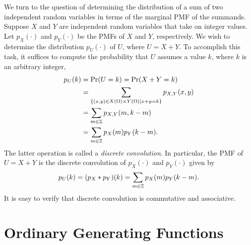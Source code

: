 We turn to the question of determining the distribution of a sum of two independent random variables in terms of the marginal PMF of the summands.
Suppose $X$ and $Y$ are independent random variables that take on integer values.
Let $p_X(\cdot)$ and $p_Y(\cdot)$ be the PMFs of $X$ and $Y$, respectively.
We wish to determine the distribution $p_U (\cdot)$ of $U$, where $U = X + Y$.
To accomplish this task, it suffices to compute the probability that $U$ assumes a value $k$, where $k$ is an arbitrary integer,
\begin{equation*}
\begin{split}
p_U (k) &= \Pr (U = k) = \Pr (X + Y = k) \\
&= \sum_{ \{ (x,y) \in X(\Omega) \times Y(\Omega) | x + y = k \} } p_{X,Y} (x, y) \\
&= \sum_{ m \in \mathbb{Z} } p_{X,Y} (m, k-m) \\
&= \sum_{ m \in \mathbb{Z} } p_X (m) p_Y(k-m) .
\end{split}
\end{equation*}
The latter operation is called a \emph{discrete convolution}. 
In particular, the PMF of $U = X + Y$ is the discrete convolution of $p_X (\cdot)$ and $p_Y (\cdot)$ given by
\begin{equation} \label{equation:DiscreteConvolution}
p_U(k) = (p_X \ast p_Y)(k)
= \sum_{m \in \mathbb{Z} } p_X(m) p_Y(k-m) .
\end{equation}
It is easy to verify that discrete convolution is commutative and associative.

\section{Ordinary Generating Functions}
\label{section:OrdinaryGeneratingFunctions}

